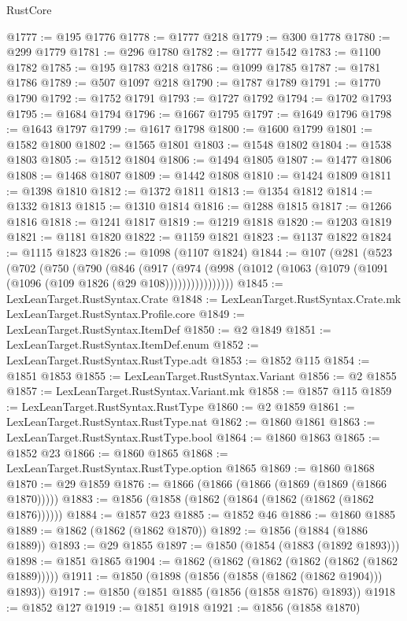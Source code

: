 \begin{lexlean}{RustCore}
\begin{coremodule}
@1777 := @195 @1776
@1778 := @1777 @218
@1779 := @300 @1778
@1780 := @299 @1779
@1781 := @296 @1780
@1782 := @1777 @1542
@1783 := @1100 @1782
@1785 := @195 @1783 @218
@1786 := @1099 @1785
@1787 := @1781 @1786
@1789 := @507 @1097 @218
@1790 := @1787 @1789
@1791 := @1770 @1790
@1792 := @1752 @1791
@1793 := @1727 @1792
@1794 := @1702 @1793
@1795 := @1684 @1794
@1796 := @1667 @1795
@1797 := @1649 @1796
@1798 := @1643 @1797
@1799 := @1617 @1798
@1800 := @1600 @1799
@1801 := @1582 @1800
@1802 := @1565 @1801
@1803 := @1548 @1802
@1804 := @1538 @1803
@1805 := @1512 @1804
@1806 := @1494 @1805
@1807 := @1477 @1806
@1808 := @1468 @1807
@1809 := @1442 @1808
@1810 := @1424 @1809
@1811 := @1398 @1810
@1812 := @1372 @1811
@1813 := @1354 @1812
@1814 := @1332 @1813
@1815 := @1310 @1814
@1816 := @1288 @1815
@1817 := @1266 @1816
@1818 := @1241 @1817
@1819 := @1219 @1818
@1820 := @1203 @1819
@1821 := @1181 @1820
@1822 := @1159 @1821
@1823 := @1137 @1822
@1824 := @1115 @1823
@1826 := @1098 (@1107 @1824)
@1844 := @107
    (@281
      (@523
        (@702
          (@750
            (@790
              (@846
                (@917
                  (@974
                    (@998 (@1012 (@1063 (@1079 (@1091 (@1096 (@109 @1826 (@29 @108))))))))))))))))
@1845 := LexLeanTarget.RustSyntax.Crate
@1848 := LexLeanTarget.RustSyntax.Crate.mk LexLeanTarget.RustSyntax.Profile.core
@1849 := LexLeanTarget.RustSyntax.ItemDef
@1850 := @2 @1849
@1851 := LexLeanTarget.RustSyntax.ItemDef.enum
@1852 := LexLeanTarget.RustSyntax.RustType.adt
@1853 := @1852 @115
@1854 := @1851 @1853
@1855 := LexLeanTarget.RustSyntax.Variant
@1856 := @2 @1855
@1857 := LexLeanTarget.RustSyntax.Variant.mk
@1858 := @1857 @115
@1859 := LexLeanTarget.RustSyntax.RustType
@1860 := @2 @1859
@1861 := LexLeanTarget.RustSyntax.RustType.nat
@1862 := @1860 @1861
@1863 := LexLeanTarget.RustSyntax.RustType.bool
@1864 := @1860 @1863
@1865 := @1852 @23
@1866 := @1860 @1865
@1868 := LexLeanTarget.RustSyntax.RustType.option @1865
@1869 := @1860 @1868
@1870 := @29 @1859
@1876 := @1866 (@1866 (@1866 (@1869 (@1869 (@1866 @1870)))))
@1883 := @1856 (@1858 (@1862 (@1864 (@1862 (@1862 (@1862 @1876))))))
@1884 := @1857 @23
@1885 := @1852 @46
@1886 := @1860 @1885
@1889 := @1862 (@1862 (@1862 @1870))
@1892 := @1856 (@1884 (@1886 @1889))
@1893 := @29 @1855
@1897 := @1850 (@1854 (@1883 (@1892 @1893)))
@1898 := @1851 @1865
@1904 := @1862 (@1862 (@1862 (@1862 (@1862 (@1862 @1889)))))
@1911 := @1850 (@1898 (@1856 (@1858 (@1862 (@1862 @1904))) @1893))
@1917 := @1850 (@1851 @1885 (@1856 (@1858 @1876) @1893))
@1918 := @1852 @127
@1919 := @1851 @1918
@1921 := @1856 (@1858 @1870)

\end{coremodule}
\end{lexlean}
